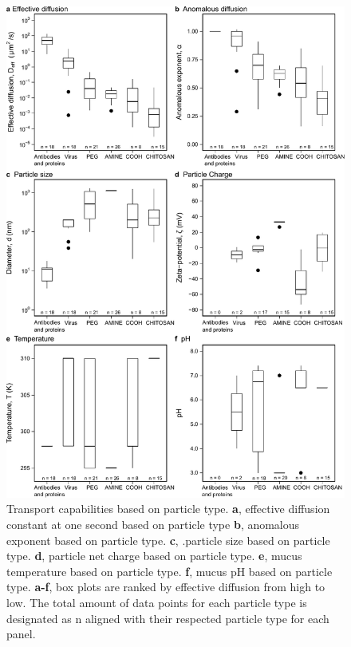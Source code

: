 \documentclass[a4paper]{article}
\begin{document}
\begin{figure}[H]
    \centering
    \includegraphics[width = 12 cm]{Figure_Particle_Type.pdf}
    \caption{Transport capabilities based on particle type. \textbf{a},  effective diffusion constant at one second based on particle type \textbf{b}, anomalous exponent based on particle type.  \textbf{c}, .particle size based on particle type. \textbf{d}, particle net charge based on particle type. \textbf{e},  mucus temperature based on particle type. \textbf{f},  mucus pH based on particle type. \textbf{a-f}, box plots are ranked by effective diffusion from high to low. The total amount of data points for each particle type is designated as n aligned with their respected particle type for each panel. 
    }
    \label{fig:ParticleTypeBOX}
\end{figure}

\clearpage
\end{document}
